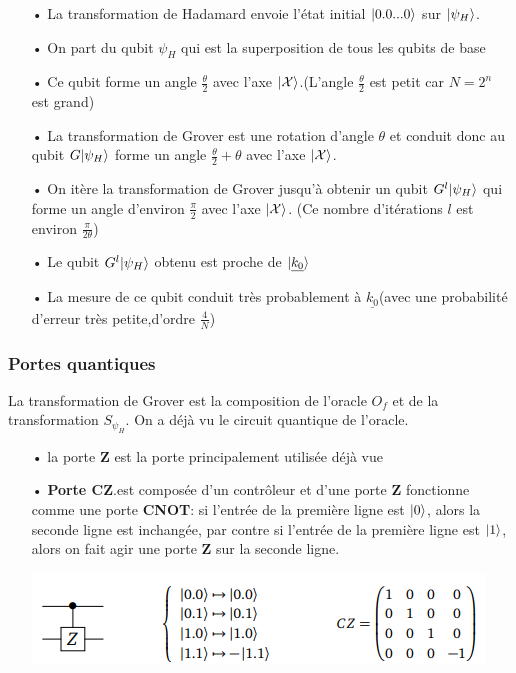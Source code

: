 \documentclass[12pt,openany]{report}
\DeclarePairedDelimiter\ket{\lvert}{\rangle}
\begin{document}
\begin{itemize}
\item[•] La transformation de Hadamard envoie l'état initial $\ket{0.0...0} $ sur $\ket{\psi_H} $.
\item[•] On part du qubit $\psi_H $ qui est la superposition de tous les qubits de base
\item[•] Ce qubit forme un angle $\frac{\theta}{2} $ avec l'axe $\ket{\mathcal{X}} $.(L'angle $\frac{\theta}{2} $ est petit car $N=2^n $ est grand)
\item[•]La transformation de Grover est une rotation d'angle $\theta $ et conduit donc au qubit $G\ket{\psi_H}$ forme un angle $\frac{\theta}{2}+\theta $ avec l'axe $\ket{\mathcal{X}} $.
\item[•] On itère la transformation de Grover jusqu'à obtenir un qubit $G^{l}\ket{\psi_H} $ qui forme un angle d'environ $\frac{\pi}{2} $ avec l'axe $ \ket{\mathcal{X}}  $. (Ce nombre d'itérations $l$ est environ $\frac{\pi}{2 \theta} $)
\item[•] Le qubit $G^{l}\ket{\psi_H} $ obtenu est proche de $\ket{\underline{k_0}} $

\item[•] La mesure de ce qubit conduit très probablement à $\underline{k_0} $(avec une probabilité d'erreur très petite,d'ordre $ \frac{4}{N}$)

\end{itemize}

\subsubsection{Portes quantiques}
La transformation de Grover est la composition de l'oracle $\mathit{O}_f $ et de la transformation $\mathit{S}_{\psi_H} $. On a déjà vu le circuit quantique de l'oracle.\\

\begin{itemize}
\item[•] la porte \textbf{Z} est la porte principalement utilisée déjà vue

\item[•] \textbf{Porte CZ}.est composée d'un contrôleur et d'une porte \textbf{Z} fonctionne comme une porte \textbf{CNOT}: si l'entrée de la première ligne est $\ket{0} $, alors la seconde ligne est inchangée, par contre si l'entrée de la première ligne est $\ket{1} $, alors on fait agir une porte \textbf{Z} sur la seconde ligne.


\begin{center}
\includegraphics[scale=1.3]{./cz}
\end{center}

\end{itemize}
\end{document}
